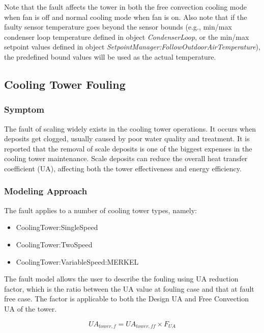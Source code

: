 Note that the fault affects the tower in both the free convection cooling mode when fan is off and normal cooling mode when fan is on. Also note that if the faulty sensor temperature goes beyond the sensor bounds (e.g., min/max condenser loop temperature defined in object \emph{CondenserLoop}, or the min/max setpoint values defined in object \emph{SetpointManager:FollowOutdoorAirTemperature}), the predefined bound values will be used as the actual temperature.


\subsection{Cooling Tower Fouling}\label{cooling-tower-fouling}

\subsubsection{Symptom}

The fault of scaling widely exists in the cooling tower operations. It occurs when deposits get clogged, usually caused by poor water quality and treatment. It is reported that the removal of scale deposits is one of the biggest expenses in the cooling tower maintenance. Scale deposits can reduce the overall heat transfer coefficient (UA), affecting both the tower effectiveness and energy efficiency.

\subsubsection{Modeling Approach}

The fault applies to a number of cooling tower types, namely:

\begin{itemize}
\tightlist
\item
  CoolingTower:SingleSpeed
\item
  CoolingTower:TwoSpeed
\item
  CoolingTower:VariableSpeed:MERKEL
\end{itemize}

The fault model allows the user to describe the fouling using UA reduction factor, which is the ratio between the UA value at fouling case and that at fault free case. The factor is applicable to both the Design UA and Free Convection UA of the tower.

\begin{equation}
UA_{tower,f} = UA_{tower,ff} \times F_{UA}
\end{equation}

